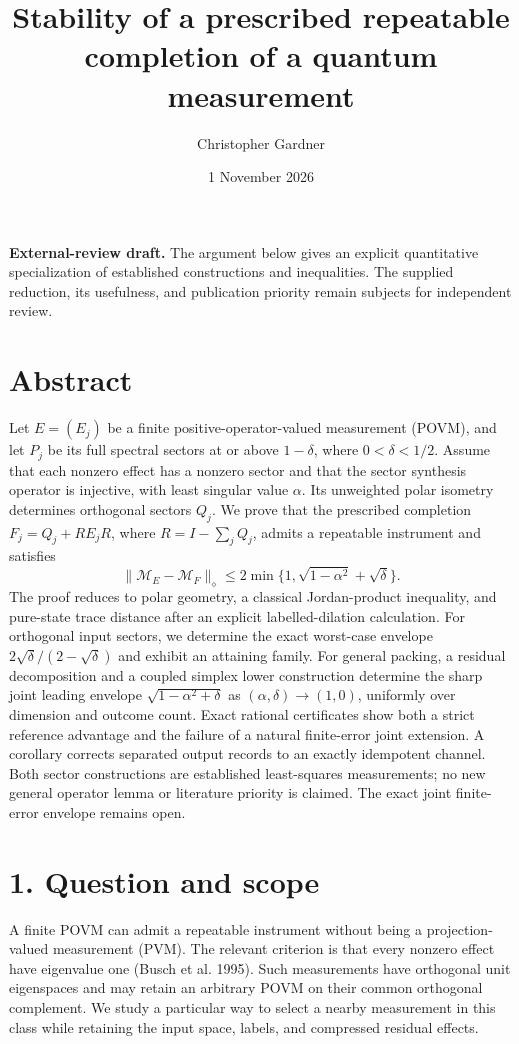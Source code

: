 \documentclass[
  11pt,
  a4paper,
]{article}
\title{Stability of a prescribed repeatable completion of a quantum
measurement}
\author{Christopher Gardner}
\date{1 November 2026}
\begin{document}
\maketitle

\textbf{External-review draft.} The argument below gives an explicit
quantitative specialization of established constructions and
inequalities. The supplied reduction, its usefulness, and publication
priority remain subjects for independent review.

\section{Abstract}\label{abstract}

Let \(E=(E_j)\) be a finite positive-operator-valued measurement (POVM),
and let \(P_j\) be its full spectral sectors at or above \(1-\delta\),
where \(0<\delta<1/2\). Assume that each nonzero effect has a nonzero
sector and that the sector synthesis operator is injective, with least
singular value \(\alpha\). Its unweighted polar isometry determines
orthogonal sectors \(Q_j\). We prove that the prescribed completion
\(F_j=Q_j+RE_jR\), where \(R=I-\sum_jQ_j\), admits a repeatable
instrument and satisfies \[\|\mathcal M_E-\mathcal M_F\|_\diamond
\le 2\min\{1,\sqrt{1-\alpha^2}+\sqrt\delta\}.\] The proof reduces to
polar geometry, a classical Jordan-product inequality, and pure-state
trace distance after an explicit labelled-dilation calculation. For
orthogonal input sectors, we determine the exact worst-case envelope
\(2\sqrt\delta/(2-\sqrt\delta)\) and exhibit an attaining family. For
general packing, a residual decomposition and a coupled simplex lower
construction determine the sharp joint leading envelope
\(\sqrt{1-\alpha^2+\delta}\) as \((\alpha,\delta)\to(1,0)\), uniformly
over dimension and outcome count. Exact rational certificates show both
a strict reference advantage and the failure of a natural finite-error
joint extension. A corollary corrects separated output records to an
exactly idempotent channel. Both sector constructions are established
least-squares measurements; no new general operator lemma or literature
priority is claimed. The exact joint finite-error envelope remains open.

\section{1. Question and scope}\label{question-and-scope}

A finite POVM can admit a repeatable instrument without being a
projection-valued measurement (PVM). The relevant criterion is that
every nonzero effect have eigenvalue one (Busch et al. 1995). Such
measurements have orthogonal unit eigenspaces and may retain an
arbitrary POVM on their common orthogonal complement. We study a
particular way to select a nearby measurement in this class while
retaining the input space, labels, and compressed residual effects.
\end{document}
